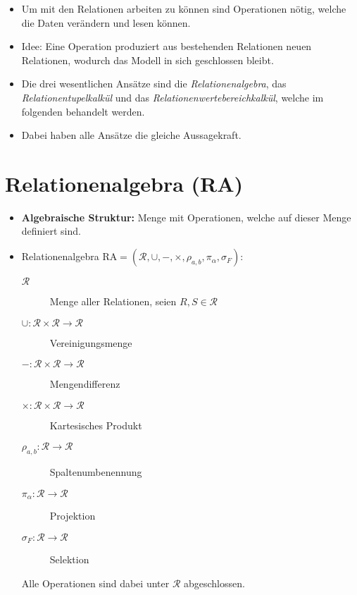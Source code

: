 \documentclass[a4paper, 11pt, accentcolor = tud3b]{tudreport}
\begin{document}
	    \begin{itemize}
	    	\item Um mit den Relationen arbeiten zu können sind Operationen nötig, welche die Daten verändern und lesen können.
	    	\item Idee: Eine Operation produziert aus bestehenden Relationen neuen Relationen, wodurch das Modell in sich geschlossen bleibt.
	    	\item Die drei wesentlichen Ansätze sind die \textit{Relationenalgebra}, das \textit{Relationentupelkalkül} und das \textit{Relationenwertebereichkalkül}, welche im folgenden behandelt werden.
	    	\item Dabei haben alle Ansätze die gleiche Aussagekraft.
	    \end{itemize}

        \section{Relationenalgebra (RA)} %
            \begin{itemize}
            	\item \textbf{Algebraische Struktur:} Menge mit Operationen, welche auf dieser Menge definiert sind.
            	\item Relationenalgebra \( \text{RA} = (\mathcal{R}, \cup, -, \times, \rho_{a,b}, \pi_\alpha, \sigma_F) \):
            		\begin{description}
            			\item[\( \mathcal{R} \)] Menge aller Relationen, seien \( R, S \in \mathcal{R} \)
            			\item[\( \cup : \mathcal{R} \times \mathcal{R} \rightarrow \mathcal{R} \)] Vereinigungsmenge
            			\item[\( - : \mathcal{R} \times \mathcal{R} \rightarrow \mathcal{R} \)] Mengendifferenz
            			\item[\( \times : \mathcal{R} \times \mathcal{R} \rightarrow \mathcal{R} \)] Kartesisches Produkt
            			\item[\( \rho_{a,b} : \mathcal{R} \rightarrow \mathcal{R} \)] Spaltenumbenennung
            			\item[\( \pi_\alpha : \mathcal{R} \rightarrow \mathcal{R} \)] Projektion
            			\item[\( \sigma_F : \mathcal{R} \rightarrow \mathcal{R} \)] Selektion
            		\end{description}
            		Alle Operationen sind dabei unter \( \mathcal{R} \) abgeschlossen.
            \end{itemize}
\end{document}
